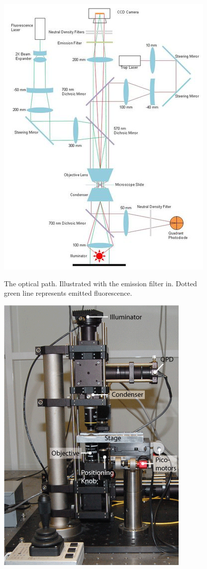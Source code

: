 \documentclass{../lab}
\begin{document}
\begin{figure}[h]
    \centering
    \href{http://experimentationlab.berkeley.edu/sites/default/files/images/400px-Graphic1.jpg}{\includegraphics[width=0.5\linewidth]{images/400px-Graphic1.jpg}}
    \caption{The optical path. Illustrated with the emission filter in. Dotted green line represents emitted fluorescence.}
    \label{fig:400px-Graphic1}
\end{figure}

\begin{figure}[h]
    \centering
    \href{http://experimentationlab.berkeley.edu/sites/default/files/images/OTZ_From_Front.gif}{\includegraphics[width=0.5\linewidth]{images/OTZ_From_Front.png}}
    \caption{}
    \label{fig:OTZ_From_Front}
\end{figure}
\end{document}
